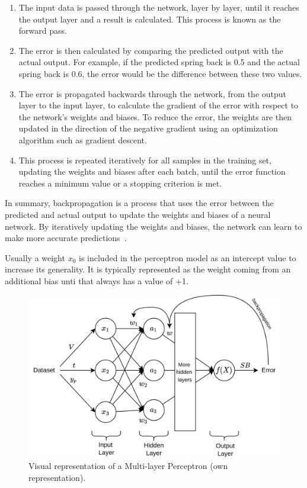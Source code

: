 \begin{enumerate}
    \item The input data is passed through the network, layer by layer, until it reaches the output layer and a
    result is calculated. This process is known as the forward pass.
    \item The error is then calculated by comparing the predicted output with the actual output. For example, if the
    predicted spring back is 0.5 and the actual spring back is 0.6, the error would be the difference between
    these two values.
    \item The error is propagated backwards through the network, from the output layer to the input layer, to
    calculate the gradient of the error with respect to the network's weights and biases. To reduce the error,
    the weights are then updated in the direction of the negative gradient using an optimization algorithm such
    as gradient descent.
    \item This process is repeated iteratively for all
    samples in the training set, updating the weights and biases after each batch, until the error function
    reaches a minimum value or a stopping criterion is met.
\end{enumerate}

In summary, backpropagation is a process that uses the error between the predicted and actual output to update the
weights and biases of a neural network. By iteratively updating the weights and biases, the network can learn to make
more accurate predictions~\cite{nielsen_neuralnetworksdeep_2015}.

Usually a weight $x_0$ is included in the perceptron model as an intercept value to increase its generality.
It is typically represented as the weight coming from an additional bias unti that always has a value of +1.

\begin{figure}[h]
    \begin{tcolorbox}[arc=0pt,boxrule=0.5pt]
        \centering
        \includegraphics[width=1\textwidth]{chap4/images/mlp_example}
    \end{tcolorbox}
    \caption{Visual representation of a Multi-layer Perceptron (own representation).}
    \label{fig:mlp-example}
\end{figure}


